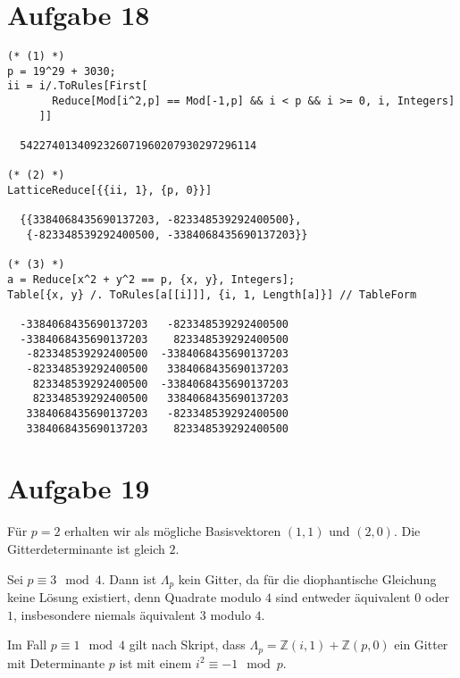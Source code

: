 \section*{Aufgabe 18}
\begin{lstlisting}
(* (1) *)
p = 19^29 + 3030;
ii = i/.ToRules[First[
       Reduce[Mod[i^2,p] == Mod[-1,p] && i < p && i >= 0, i, Integers]
     ]]

  5422740134092326071960207930297296114

(* (2) *)
LatticeReduce[{{ii, 1}, {p, 0}}]

  {{3384068435690137203, -823348539292400500},
   {-823348539292400500, -3384068435690137203}}

(* (3) *)
a = Reduce[x^2 + y^2 == p, {x, y}, Integers];
Table[{x, y} /. ToRules[a[[i]]], {i, 1, Length[a]}] // TableForm

  -3384068435690137203   -823348539292400500
  -3384068435690137203    823348539292400500
   -823348539292400500  -3384068435690137203
   -823348539292400500   3384068435690137203
    823348539292400500  -3384068435690137203
    823348539292400500   3384068435690137203
   3384068435690137203   -823348539292400500
   3384068435690137203    823348539292400500
\end{lstlisting}

\newpage
\section*{Aufgabe 19}
Für $p=2$ erhalten wir als mögliche Basisvektoren $(1, 1)$ und $(2, 0)$. Die
Gitterdeterminante ist gleich $2$.

Sei $p \equiv 3\mod 4$. Dann ist $\Lambda_p$ kein Gitter, da für die
diophantische Gleichung keine Lösung existiert, denn Quadrate modulo $4$ sind
entweder äquivalent $0$ oder $1$, insbesondere niemals äquivalent $3$ modulo
$4$.

Im Fall $p \equiv 1\mod 4$ gilt nach Skript, dass $\Lambda_p =
\mathbb{Z}(i,1)+\mathbb{Z}(p,0)$ ein Gitter mit Determinante $p$ ist mit einem
$i^2 \equiv -1\mod p$.

